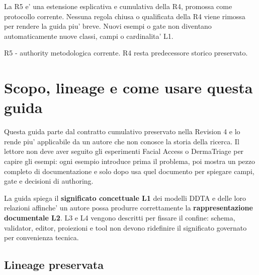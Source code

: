 \documentclass[11pt,a4paper]{article}
\begin{document}
\begin{titlepage}
\vfill
\begin{ddtacore}[title={Regola di costruzione della R5}]
La R5 e' una estensione esplicativa e cumulativa della R4, promossa come protocollo corrente. Nessuna regola chiusa o qualificata della R4 viene rimossa per rendere la guida piu' breve. Nuovi esempi o gate non diventano automaticamente nuove classi, campi o cardinalita' L1.
\end{ddtacore}

\begin{flushright}
\sffamily\small\color{DDTAGray}R5 - authority metodologica corrente. R4 resta predecessore storico preservato.
\end{flushright}
\end{titlepage}

\tableofcontents
\clearpage

\section{Scopo, lineage e come usare questa guida}

Questa guida parte dal contratto cumulativo preservato nella Revision 4 e lo rende piu' applicabile da un autore che non conosce la storia della ricerca. Il lettore non deve aver seguito gli esperimenti Facial Access o DermaTriage per capire gli esempi: ogni esempio introduce prima il problema, poi mostra un pezzo completo di documentazione e solo dopo usa quel documento per spiegare campi, gate e decisioni di authoring.

\begin{ddtaprinciple}[title={Scopo primario: L1 -> L2}]
La guida spiega il \textbf{significato concettuale L1} dei modelli DDTA e delle loro relazioni affinche' un autore possa produrre correttamente la \textbf{rappresentazione documentale L2}. L3 e L4 vengono descritti per fissare il confine: schema, validator, editor, proiezioni e tool non devono ridefinire il significato governato per convenienza tecnica.
\end{ddtaprinciple}

\subsection{Lineage preservata}
\end{document}
